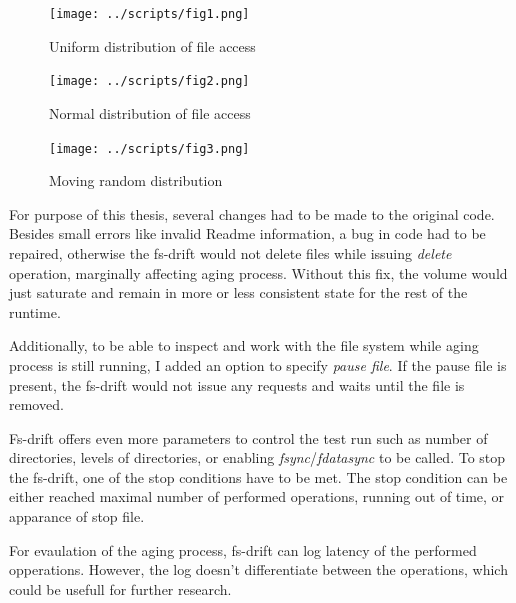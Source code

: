 \documentclass[
  color, %
  table, %
  lof,   %
  lot,   %
]{fithesis3}
\begin{document}
\begin{figure}[!htb]
    \centering
    \begin{minipage}{\textwidth}
        \centering
        \texttt{[image: ../scripts/fig1.png]}
        \caption{Uniform distribution of file access}
\label{fig:rand1}
    \end{minipage}\hfill
    \begin{minipage}{\textwidth}
        \centering
        \texttt{[image: ../scripts/fig2.png]}
        \caption{Normal distribution of file access}

\label{fig:rand2}
    \end{minipage}

\end{figure}
\begin{figure}
    \begin{minipage}{\textwidth}
        \centering
        \texttt{[image: ../scripts/fig3.png]}
        \caption{Moving random distribution}
\label{fig:rand3}
    \end{minipage}
\end{figure}

For purpose of this thesis, several changes had to be made to the original code. Besides small errors like invalid Readme information, a bug in code had to be repaired, otherwise the fs-drift would not delete files while issuing \textit{delete} operation, marginally affecting aging process. Without this fix, the volume would just saturate and remain in more or less consistent state for the rest of the runtime.

Additionally, to be able to inspect and work with the file system while aging process is still running, I added an option to specify \textit{pause file}. If the pause file is present, the fs-drift would not issue any requests and waits until the file is removed\footnotemark[1].

Fs-drift offers even more parameters to control the test run such as number of directories, levels of directories, or enabling \textit{fsync}/\textit{fdatasync} to be called. To stop the fs-drift, one of the stop conditions have to be met. The stop condition can be either reached maximal number of performed operations, running out of time, or apparance of stop file.

For evaulation of the aging process, fs-drift can log latency of the performed opperations. However, the log doesn't differentiate between the operations, which could be usefull for further research.
\end{document}
